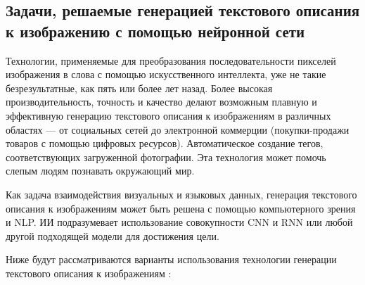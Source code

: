 \documentclass[bachelor, och, coursework]{SCWorks}
\begin{document}
    \subsection{Задачи, решаемые генерацией текстового описания к изображению с помощью нейронной сети}

        Технологии, применяемые для преобразования последовательности пикселей
        изображения в слова с помощью искусственного интеллекта, уже не такие
        безрезультатные, как пять или более лет назад. Более высокая
        производительность, точность и качество делают возможным плавную и
        эффективную генерацию текстового описания к изображениям в различных
        областях — от социальных сетей до электронной коммерции (покупки-продажи
        товаров с помощью цифровых ресурсов). Автоматическое создание тегов,
        соответствующих загруженной фотографии. Эта технология может помочь
        слепым людям познавать окружающий мир.
        
        Как задача взаимодействия визуальных и языковых данных, генерация
        текстового описания к изображениям может быть решена с помощью
        компьютерного зрения и NLP. ИИ подразумевает использование совокупности
        CNN и RNN или любой другой подходящей модели для достижения цели.

        Ниже будут рассматриваются варианты использования технологии генерации
        текстового описания к изображениям \cite{applications}:
\end{document}
